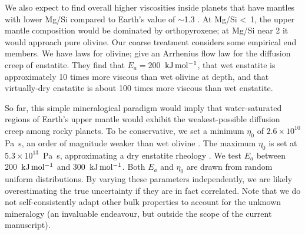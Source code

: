 We also expect to find overall higher viscosities inside planets that have mantles with lower Mg/Si compared to Earth's value of $\sim$1.3 \citep{pagano_chemical_2015, spaargaren_influence_2020, ballmer_diversity_2021}. At Mg/Si \textless~1, the upper mantle composition would be dominated by orthopyroxene; at Mg/Si near 2 it would approach pure olivine. Our coarse treatment considers some empirical end members. We have laws for olivine; \citet{zhang_diffusion_2017} give an Arrhenius flow law for the diffusion creep of enstatite. They find that $E_a = 200$~$\rm{kJ\,mol^{-1}}$, that wet enstatite is approximately 10 times more viscous than wet olivine at depth, and that virtually-dry enstatite is about 100 times more viscous than wet enstatite.



So far, this simple mineralogical paradigm would imply that water-saturated regions of Earth's upper mantle would exhibit the weakest-possible diffusion creep among rocky planets.
To be conservative, we set a minimum $\eta_0$ of $2.6 \times 10^{10}$ Pa~s, an order of magnitude weaker than wet olivine \citep{karato_rheology_1993}. The maximum $\eta_0$ is set at $5.3 \times 10^{13}$~Pa~s, approximating a dry enstatite rheology \citep{zhang_diffusion_2017}. We test $E_a$ between 200~$\rm{kJ\,mol^{-1}}$ and 300~$\rm{kJ\,mol^{-1}}$. Both $E_a$ and $\eta_0$ are drawn from random uniform distributions. By varying these parameters independently, we are likely overestimating the true uncertainty if they are in fact correlated. Note that we do not self-consistently adapt other bulk properties to account for the unknown mineralogy (an invaluable endeavour, but outside the scope of the current manuscript).







